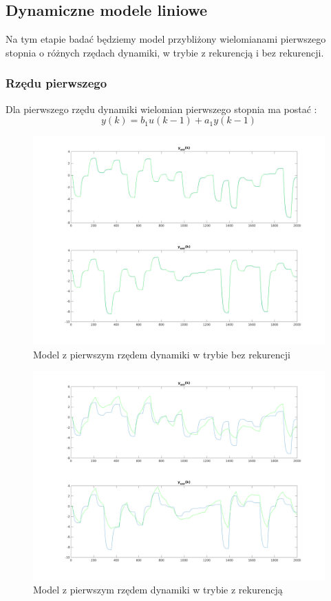 \documentclass[a4paper, 11pt]{article}
\begin{document}
\subsection{Dynamiczne modele liniowe}
Na tym etapie badać będziemy model przybliżony wielomianami pierwszego stopnia o różnych rzędach dynamiki, w trybie z rekurencją i bez rekurencji. 

\subsubsection{Rzędu pierwszego}
Dla pierwszego rzędu dynamiki wielomian pierwszego stopnia ma postać : 
$$y(k) = b_1u(k-1) + a_1y(k-1)$$
\begin{figure}[H]
\centering
\includegraphics[scale=0.50]{dane_dyn_mod_brek_D_1.png}
\caption{Model z pierwszym rzędem dynamiki w trybie bez rekurencji }
\label{}
\end{figure}
\begin{figure}[H]
\centering
\includegraphics[scale=0.50]{dane_dyn_mod_rek_D_1.png}
\caption{Model z pierwszym rzędem dynamiki w trybie z rekurencją }
\label{}
\end{figure}
\end{document}
